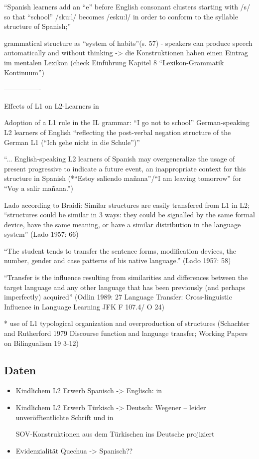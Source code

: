 ``Spanish learners add an ``e'' before English consonant clusters starting with /s/ so that ``school'' /sku:l/ becomes /esku:l/ in order to conform to the syllable structure of Spanish;''

grammatical structure as ``system of habits''(s. 57) - speakers can produce speech automatically and without thinking -> die Konstruktionen haben einen Eintrag im mentalen Lexikon (check Einführung \cite{Ziem13} Kapitel 8 ``Lexikon-Grammatik Kontinuum'')

----------------

Effects of L1 on L2-Learners in \cite{Braidi99}


Adoption of a L1 rule in the IL grammar:
``I go not to school'' German-speaking L2 learners of English ``reflecting the post-verbal negation structure
of the German L1 (``Ich gehe nicht in die Schule'')''

``... English-speaking L2 learners of Spanish may overgeneralize the usage of present progressive to indicate a
future event, an inappropriate context for this structure in Spanish (*``Estoy saliendo mañana''/``I am leaving tomorrow''
for ``Voy a salir mañana.'')


Lado according to Braidi:
Similar structures are easily transfered from L1 in L2;
``structures could be similar in 3 ways: they could be signalled by the same formal device, have the same meaning,
or have a similar distribution in the language system'' (Lado 1957: 66)

``The student tends to transfer the sentence forms, modification devices, the number, gender and case patterns of
his native language.'' (Lado 1957: 58)

``Transfer is the influence resulting from similarities and differences between the target language and any other
language that has been previously (and perhaps imperfectly) acquired'' (Odlin 1989: 27 Language Transfer: Cross-linguistic Influence in Language Learning
JFK F 107.4/ O 24)

* use of L1 typological organization and overproduction of structures (Schachter and Rutherford 1979 Discourse function and language transfer; Working Papers on Bilingualism 19 3-12)


\subsection{Daten}
\begin{itemize}
    \item Kindlichem L2 Erwerb Spanisch -> Englisch: \cite{Wong-Fillmore76} in \cite{Haberzettl06}
    \item Kindlichem L2 Erwerb Türkisch -> Deutsch: Wegener\cite{} -- leider unveröfftentlichte Schrift
und \cite{Haberzettl05} in \cite{Haberzettl06}

SOV-Konstruktionen aus dem Türkischen ins Deutsche projiziert

    \item Evidenzialität Quechua -> Spanisch??
\end{itemize}
